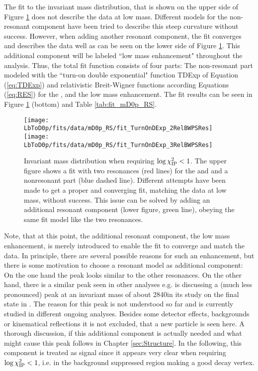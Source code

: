 The fit to the invariant \Dz\proton mass distribution, that is shown on the upper side of Figure \ref{fig:fit_mD0p_RS} does not describe the data at low \Dz\proton mass.
Different models for the non-resonant component have been tried to describe this steep curvature without success.
However, when adding another resonant component, the fit converges and describes the data well as can be seen on the lower side of Figure \ref{fig:fit_mD0p_RS}.
This additional component will be labeled ``low mass enhancement" throughout the analysis.
Thus, the total fit function consists of four parts: 
The non-resonant part modeled with the ``turn-on double exponential" function TDExp of Equation (\ref{eq:TDExp}) and relativistic Breit-Wigner functions according Equations (\ref{eq:RES}) for the \LcResI, \LcResII and the low mass enhancement. 
The fit results can be seen in Figure \ref{fig:fit_mD0p_RS} (bottom) and Table \ref{tab:fit_mD0p_RS}.
\begin{figure}[tbp]
    \centering
	\texttt{[image: LbToD0p/fits/data/mD0p\_RS/fit\_TurnOnDExp\_2RelBWPSRes]} \\
	\texttt{[image: LbToD0p/fits/data/mD0p\_RS/fit\_TurnOnDExp\_3RelBWPSRes]}
	\caption{Invariant \Dz\proton mass distribution when requiring $\log \chi^2_{\text{IP}} < 1$. 
             The upper figure shows a fit with two resonances (red lines) for the \LcResI and \LcResII and a nonresonant part (blue dashed line). 
             Different attempts have been made to get a proper and converging fit, matching the data at low \Dz\proton mass, without success. 
             This issue can be solved by adding an additional resonant component (lower figure, green line), obeying the same fit model like the two resonances.}
    \label{fig:fit_mD0p_RS}
\end{figure}

Note, that at this point, the additional resonant component, the low mass enhancement, is merely introduced to enable the fit to converge and match the data.
In principle, there are several possible reasons for such an enhancement, but there is some motivation to choose a resonant model as additional component:
On the one hand the peak looks similar to the other resonances.
On the other hand, there is a similar peak seen in other analyses e.g. \babar is discussing a (much less pronounced) peak at an invariant \Dz\proton mass of about 2840\mev in its study on the \Dz\proton final state in \cite{BaBar_D0p}.
The reason for this peak is not understood so far and is currently studied in different ongoing \lhcb analyses.
Besides some detector effects, backgrounds or kinematical reflections it is not excluded, that a new particle is seen here.
A thorough discussion, if this additional component is actually needed and what might cause this peak follows in Chapter \ref{sec:Structure}.
In the following, this component is treated as signal since it appears very clear when requiring $\log \chi^2_{\text{IP}} < 1$, i.e. in the background suppressed region making a good decay vertex.


